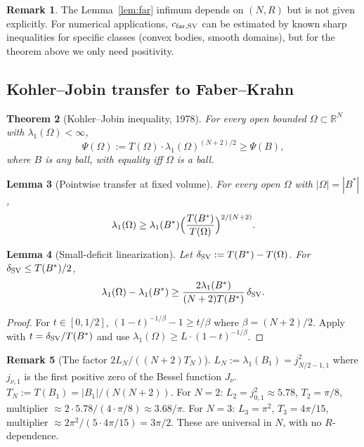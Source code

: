 \documentclass[11pt]{amsart}
\newtheorem{theorem}{Theorem}[section]
\newtheorem{lemma}[theorem]{Lemma}
\theoremstyle{definition}
\newtheorem{remark}[theorem]{Remark}
\newcommand{\R}{\mathbb R}
\newcommand{\abs}[1]{\left|#1\right|}
\begin{document}
\begin{remark}
The Lemma~\ref{lem:far} infimum depends on $(N,R)$ but is not given
explicitly. For numerical applications, $c_{\rm far,SV}$ can be estimated by
known sharp inequalities for specific classes (convex bodies, smooth
domains), but for the theorem above we only need positivity.
\end{remark}

\subsection{Kohler--Jobin transfer to Faber--Krahn}\label{sec:kj}

\begin{theorem}[Kohler--Jobin inequality, 1978]\label{thm:kj}
For every open bounded $\Omega\subset\R^N$ with $\lambda_1(\Omega)<\infty$,
\[
\Psi(\Omega):=T(\Omega)\cdot\lambda_1(\Omega)^{(N+2)/2}\ge\Psi(B),
\]
where $B$ is any ball, with equality iff $\Omega$ is a ball.
\end{theorem}

\begin{lemma}[Pointwise transfer at fixed volume]\label{lem:transferpt}
For every open $\Omega$ with $\abs{\Omega}=\abs{B^*}$,
\[
\lambda_1(\Omega)\ge\lambda_1(B^*)\Bigl(\frac{T(B^*)}{T(\Omega)}\Bigr)^{2/(N+2)}.
\]
\end{lemma}

\begin{lemma}[Small-deficit linearization]\label{lem:transferlin}
Let $\delta_{\rm SV}:=T(B^*)-T(\Omega)$. For $\delta_{\rm SV}\le T(B^*)/2$,
\[
\lambda_1(\Omega)-\lambda_1(B^*)\ge\frac{2\lambda_1(B^*)}{(N+2)T(B^*)}\,\delta_{\rm SV}.
\]
\end{lemma}

\begin{proof}
For $t\in[0,1/2]$, $(1-t)^{-1/\beta}-1\ge t/\beta$ where $\beta=(N+2)/2$.
Apply with $t=\delta_{\rm SV}/T(B^*)$ and use $\lambda_1(\Omega)\ge L\cdot(1-t)^{-1/\beta}$.
\end{proof}

\begin{remark}[The factor $2L_N/((N+2)T_N)$]
$L_N:=\lambda_1(B_1)=j_{N/2-1,1}^2$ where $j_{\nu,1}$ is the first positive
zero of the Bessel function $J_\nu$. $T_N:=T(B_1)=\abs{B_1}/(N(N+2))$.
For $N=2$: $L_2=j_{0,1}^2\approx5.78$, $T_2=\pi/8$, multiplier
$\approx2\cdot5.78/(4\cdot\pi/8)\approx3.68/\pi$. For $N=3$: $L_3=\pi^2$,
$T_3=4\pi/15$, multiplier $\approx2\pi^2/(5\cdot 4\pi/15)=3\pi/2$.
These are universal in $N$, with no $R$-dependence.
\end{remark}
\end{document}
